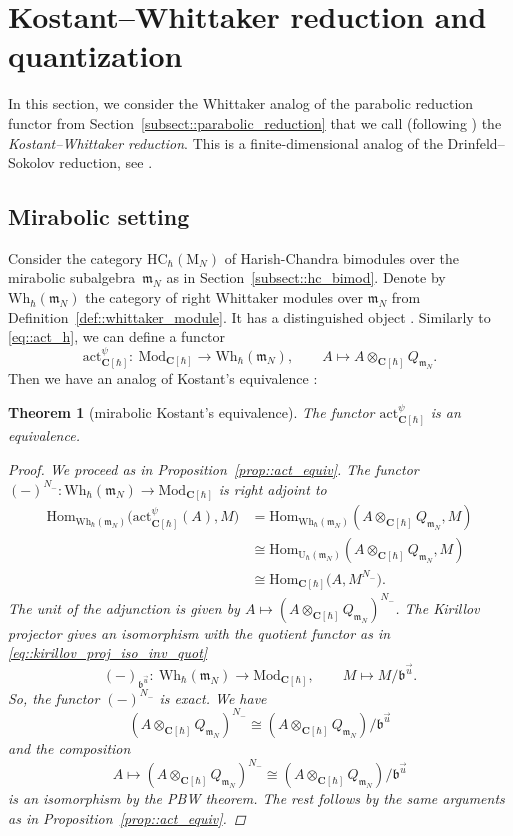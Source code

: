 \documentclass[11pt]{article}
\numberwithin{equation}{section}
\newtheorem{Theorem}{Theorem}[section]
\newcommand{\C}{\mathbf{C}}
\newcommand{\U}{\mathrm{U}_{\hbar}}
\newcommand{\rM}{\mathrm{M}}
\renewcommand{\b}{\mathfrak{b}}
\newcommand{\n}{\mathfrak{n}}
\newcommand{\m}{\mathfrak{m}}
\newcommand{\Wh}{\mathrm{Wh}_{\hbar}}
\newcommand{\act}{\mathrm{act}}
\newcommand{\Mod}[1]{{\mathrm{Mod}}_{#1}}
\newcommand{\HC}{\mathrm{HC}_{\hbar}}
\newcommand{\Hom}{\mathrm{Hom}}
\begin{document}
	\section{Kostant--Whittaker reduction and quantization}
	\label{sect::kw_red}
	
	In this section, we consider the Whittaker analog of the parabolic reduction functor from Section~\ref{subsect::parabolic_reduction} that we call (following \cite{BezrukavnikovFinkelberg}) the \emph{Kostant--Whittaker reduction}. This is a finite-dimensional analog of the Drinfeld--Sokolov reduction, see \cite{Arakawa}.
	
	\subsection{Mirabolic setting} Consider the category $\HC(\rM_N)$ of Harish-Chandra bimodules over the mirabolic subalgebra~$\m_N$ as in Section~\ref{subsect::hc_bimod}. Denote by $\Wh(\m_N)$ the category of right Whittaker modules over $\m_N$ from Definition~\ref{def::whittaker_module}. It has a distinguished object \smash{$Q_{\m_N} = \n_-^{\psi} \backslash \U(\m_N)$}. Similarly to \eqref{eq::act_h}, we can define a functor
	\begin{equation*}
		\act_{\C[\hbar]}^{\psi} \colon\ \Mod{\C[\hbar]} \rightarrow \Wh(\m_N), \qquad A \mapsto A \otimes_{\C[\hbar]} Q_{\m_N}.
	\end{equation*}
	Then we have an analog of Kostant's equivalence \cite{Kostant}:
	\begin{Theorem}[mirabolic Kostant's equivalence]
		\label{thm::mirabolic_skryabin}
		The functor $\act_{\C[\hbar]}^{\psi}$ is an equivalence.
		\begin{proof}
			We proceed as in Proposition~\ref{prop::act_equiv}. The functor $(-)^{N_-} \colon \Wh(\m_N) \rightarrow \Mod{\C[\hbar]}$ is right adjoint to \smash{$\act_{\C[\hbar]}^{\psi}$}
			\begin{align*}
				\Hom_{\Wh(\m_N)} \bigl(\act_{\C[\hbar]}^{\psi}(A), M\bigr) &= \Hom_{\Wh(\m_N)}(A \otimes_{\C[\hbar]} Q_{\m_N},M) \\
				&\cong \Hom_{\U(\m_N)} (A \otimes_{\C[\hbar]} Q_{\m_N},M) \\
				&\cong \Hom_{\C[\hbar]}\bigl(A,M^{N_-}\bigr).
			\end{align*}
			The unit of the adjunction is given by
$
			A \mapsto (A \otimes_{\C[\hbar]} Q_{\m_N})^{N_-}$.
			The Kirillov projector gives an isomorphism with the quotient functor as in \eqref{eq::kirillov_proj_iso_inv_quot}
			\[
			(-)_{\b^{\vec{u}}}\colon\ \Wh(\m_N) \rightarrow \Mod{\C[\hbar]}, \qquad M \mapsto M/\b^{\vec{u}}.
			\]
			So, the functor $(-)^{N_-}$ is exact. We have
			\[
			(A \otimes_{\C[\hbar]} Q_{\m_N})^{N_-} \cong (A \otimes_{\C[\hbar]} Q_{\m_N})/ \b^{\vec{u}}
			\]
			and the composition
			\[
			A \mapsto (A \otimes_{\C[\hbar]} Q_{\m_N})^{N_-} \cong (A \otimes_{\C[\hbar]} Q_{\m_N})/ \b^{\vec{u}}
			\]
			is an isomorphism by the PBW theorem. The rest follows by the same arguments as in Proposition~\ref{prop::act_equiv}.
		\end{proof}
	\end{Theorem}
	
\end{document}
